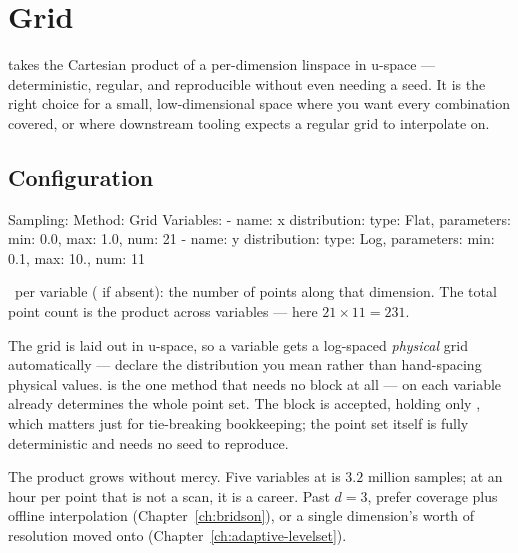 \chapter{Grid}
\label{ch:grid}

  takes the Cartesian
product of a per-dimension linspace in u-space --- deterministic, regular, and
reproducible without even needing a seed. It is the right choice for a small,
low-dimensional space where you want every combination covered, or where downstream
tooling expects a regular grid to interpolate on.

\section{Configuration}
\label{sec:grid-config}

\begin{yamlwin}
Sampling:
  Method: Grid
  Variables:
    - name: x
      distribution: {type: Flat, parameters: {min: 0.0, max: 1.0, num: 21}}
    - name: y
      distribution: {type: Log,  parameters: {min: 0.1, max: 10., num: 11}}
\end{yamlwin}

\begin{keylist}
  \item[parameters.num] \req\ per variable ( if absent): the number of
        points along that dimension. The total point count is the product across
        variables --- here $21 \times 11 = 231$.
\end{keylist}

The grid is laid out in u-space, so a  variable gets a log-spaced
\emph{physical} grid automatically --- declare the distribution you mean rather than
hand-spacing physical values.  is the one method that needs no
 block at all ---  on each variable already determines the
whole point set. The block is accepted, holding only , which
matters just for tie-breaking bookkeeping; the point set itself is fully deterministic
and needs no seed to reproduce.

\begin{jwarn}
The product grows without mercy. Five variables at  is $3.2$ million
samples; at an hour per point that is not a scan, it is a career. Past $d=3$, prefer
 coverage plus offline interpolation (Chapter~\ref{ch:bridson}), or a
single dimension's worth of resolution moved onto 
(Chapter~\ref{ch:adaptive-levelset}).
\end{jwarn}

